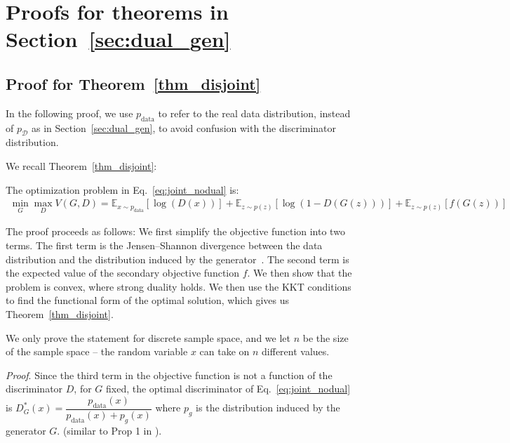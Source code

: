 \section{Proofs for theorems in Section~\ref{sec:dual_gen}}

\subsection{Proof for Theorem~\ref{thm_disjoint} }

In the following proof, we use $p_{\text{data}}$ to refer to the real data distribution, instead of $p_\mathcal{D}$ as in Section~\ref{sec:dual_gen}, to avoid confusion with the discriminator distribution.

We recall Theorem~\ref{thm_disjoint}:

\thmdisjoint*

The optimization problem in Eq.~\ref{eq:joint_nodual} is:
\begin{align*}
    \min_{G} \max_{D}  V(G, D) = \mathbb{E}_{ x \sim p_{\text{data}}} [\log(D(x))] + \mathbb{E}_{z \sim p(z)} [\log(1-D(G(z)))]  + \mathbb{E}_{z \sim p(z)} [ f ( G(z) ) ]
\end{align*}

The proof proceeds as follows: We first simplify the objective function into two terms. The first term is the Jensen–Shannon divergence between the data distribution and the distribution induced by the generator~\cite{gan}. The second term is the expected value of the secondary objective function $f$. We then show that the problem is convex, where strong duality holds. We then use the KKT conditions to find the functional form of the optimal solution, which gives us Theorem~\ref{thm_disjoint}.

We only prove the statement for discrete sample space, and we let $n$ be the size of the sample space -- the random variable $x$ can take on $n$ different values.

\textit{Proof}. Since the third term in the objective function is not a function of the discriminator $D$, for $G$ fixed, the optimal discriminator of Eq.~\ref{eq:joint_nodual} is $D^*_G(x) = \dfrac{ p_{\text{data}} (x) }{ p_{ \text{data} } (x) + p_{g }(x) }$ where $p_g$ is the distribution induced by the generator $G$.
 (similar to Prop 1 in \cite{gan} ).

